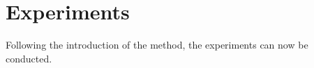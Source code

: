 \chapter{Experiments}

Following the introduction of the method, the experiments can now be conducted. 




